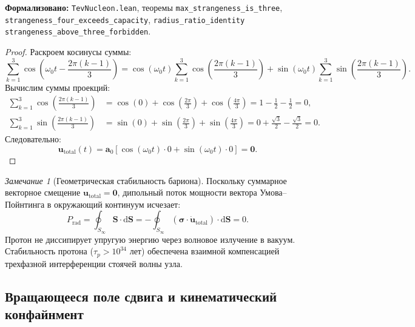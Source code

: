 \documentclass[11pt,a4paper]{article}
\theoremstyle{definition}
\theoremstyle{remark}
\newtheorem{remark}{Замечание}
\begin{document}
\noindent\small\textbf{Формализовано:} \texttt{TevNucleon.lean}, теоремы \texttt{max_strangeness_is_three}, \texttt{strangeness_four_exceeds_capacity}, \texttt{radius_ratio_identity} \texttt{strangeness\_above\_three\_forbidden}.



\begin{proof}
	Раскроем косинусы суммы:
	\begin{equation}
		\sum_{k=1}^3 \cos\left(\omega_0 t - \frac{2\pi(k-1)}{3}\right) = \cos(\omega_0 t) \sum_{k=1}^3 \cos\left(\frac{2\pi(k-1)}{3}\right) + \sin(\omega_0 t) \sum_{k=1}^3 \sin\left(\frac{2\pi(k-1)}{3}\right).
	\end{equation}
	Вычислим суммы проекций:
	\begin{align}
		\sum_{k=1}^3 \cos\left(\frac{2\pi(k-1)}{3}\right) &= \cos(0) + \cos\left(\frac{2\pi}{3}\right) + \cos\left(\frac{4\pi}{3}\right) = 1 - \frac{1}{2} - \frac{1}{2} = 0, \\
		\sum_{k=1}^3 \sin\left(\frac{2\pi(k-1)}{3}\right) &= \sin(0) + \sin\left(\frac{2\pi}{3}\right) + \sin\left(\frac{4\pi}{3}\right) = 0 + \frac{\sqrt{3}}{2} - \frac{\sqrt{3}}{2} = 0.
	\end{align}
	Следовательно:
	\begin{equation}
		\mathbf{u}_{\mathrm{total}}(t) = \mathbf{a}_0 \left[ \cos(\omega_0 t) \cdot 0 + \sin(\omega_0 t) \cdot 0 \right] = \mathbf{0}.
	\end{equation}
\end{proof}

\begin{remark}[Геометрическая стабильность бариона]
	Поскольку суммарное векторное смещение $\mathbf{u}_{\mathrm{total}} = \mathbf{0}$, дипольный поток мощности вектора Умова--Пойнтинга в окружающий континуум исчезает:
	\begin{equation}
		P_{\mathrm{rad}} = \oint_{S_\infty} \mathbf{S} \cdot \mathrm{d}\mathbf{S} = -\oint_{S_\infty} (\boldsymbol{\sigma} \cdot \dot{\mathbf{u}}_{\mathrm{total}}) \cdot \mathrm{d}\mathbf{S} = 0.
		\label{eq:proton_radiation_power_zero}
	\end{equation}
	Протон не диссипирует упругую энергию через волновое излучение в вакуум. Стабильность протона ($\tau_p > 10^{34}$ лет) обеспечена взаимной компенсацией трехфазной интерференции стоячей волны узла.
\end{remark}

\subsection{Вращающееся поле сдвига и кинематический конфайнмент}
\end{document}
